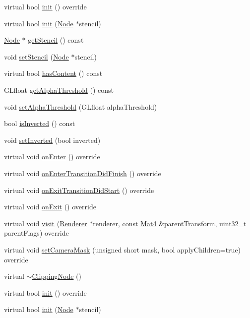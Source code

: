\begin{DoxyCompactItemize}
\item 
virtual bool \hyperlink{classClippingNode_a37848375cd3458d93c9ef182fd78219a}{init} () override
\item 
virtual bool \hyperlink{classClippingNode_aa3c1fb4afb7f0c63f123fc93f196c12c}{init} (\hyperlink{classNode}{Node} $\ast$stencil)
\item 
\hyperlink{classNode}{Node} $\ast$ \hyperlink{classClippingNode_aafc3e5b2ad2c7b7d13bb447e1c4f4ff6}{get\+Stencil} () const
\item 
void \hyperlink{classClippingNode_ac8c8dfe6eb2eeb894546eef8b6404d71}{set\+Stencil} (\hyperlink{classNode}{Node} $\ast$stencil)
\item 
virtual bool \hyperlink{classClippingNode_aeb2fdeb408f7e1b5c1f42b168c0c4e06}{has\+Content} () const
\item 
G\+Lfloat \hyperlink{classClippingNode_a3b16e238ab1a53986857f9335a5a3147}{get\+Alpha\+Threshold} () const
\item 
void \hyperlink{classClippingNode_ae2c59683b09c8373c705839b06a64d48}{set\+Alpha\+Threshold} (G\+Lfloat alpha\+Threshold)
\item 
bool \hyperlink{classClippingNode_add176fbe7d1ef979d93ed5918159654f}{is\+Inverted} () const
\item 
void \hyperlink{classClippingNode_a0733496b02e0a3673ad3c8634ff757ed}{set\+Inverted} (bool inverted)
\item 
virtual void \hyperlink{classClippingNode_a7b66e61be66f46e9ae206ecd1a3ba074}{on\+Enter} () override
\item 
virtual void \hyperlink{classClippingNode_ae083ddde34231495277586c7a8384262}{on\+Enter\+Transition\+Did\+Finish} () override
\item 
virtual void \hyperlink{classClippingNode_a4637553a7b0ae136a1e9cb1684b3db57}{on\+Exit\+Transition\+Did\+Start} () override
\item 
virtual void \hyperlink{classClippingNode_a7766b27739f9f11792908d6ca790bd92}{on\+Exit} () override
\item 
virtual void \hyperlink{classClippingNode_a2c3e648bc28a51189cecda4ae431e38b}{visit} (\hyperlink{classRenderer}{Renderer} $\ast$renderer, const \hyperlink{classMat4}{Mat4} \&parent\+Transform, uint32\+\_\+t parent\+Flags) override
\item 
virtual void \hyperlink{classClippingNode_a1a2f97b7a006e6b830632eab1e812f90}{set\+Camera\+Mask} (unsigned short mask, bool apply\+Children=true) override
\item 
virtual \hyperlink{classClippingNode_a1340c0d0f18ba0e4ebb5efd3537f1871}{$\sim$\+Clipping\+Node} ()
\item 
virtual bool \hyperlink{classClippingNode_aa71373ded3aa4177bad3f706a0570c2d}{init} () override
\item 
virtual bool \hyperlink{classClippingNode_a04ad4a1bdaa7a6ef272c62745896946a}{init} (\hyperlink{classNode}{Node} $\ast$stencil)
\end{DoxyCompactItemize}
